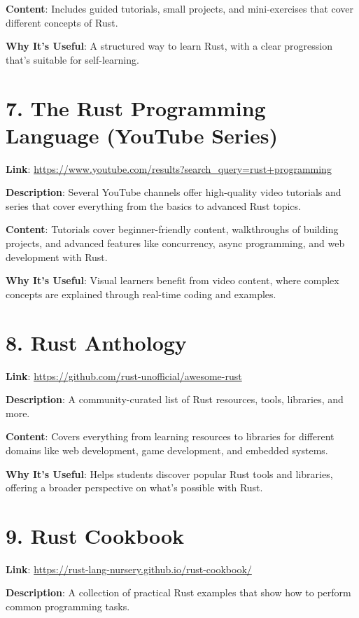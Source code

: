 \documentclass[12pt]{article}
\begin{document}
	\textbf{Content}: Includes guided tutorials, small projects, and mini-exercises that cover different concepts of Rust.
	
	\textbf{Why It’s Useful}: A structured way to learn Rust, with a clear progression that’s suitable for self-learning.
	
	\section*{7. The Rust Programming Language (YouTube Series)}
	\textbf{Link}: \url{https://www.youtube.com/results?search_query=rust+programming}
	
	\textbf{Description}: Several YouTube channels offer high-quality video tutorials and series that cover everything from the basics to advanced Rust topics.
	
	\textbf{Content}: Tutorials cover beginner-friendly content, walkthroughs of building projects, and advanced features like concurrency, async programming, and web development with Rust.
	
	\textbf{Why It’s Useful}: Visual learners benefit from video content, where complex concepts are explained through real-time coding and examples.
	
	\section*{8. Rust Anthology}
	\textbf{Link}: \href{https://github.com/rust-unofficial/awesome-rust}{https://github.com/rust-unofficial/awesome-rust}
	
	\textbf{Description}: A community-curated list of Rust resources, tools, libraries, and more.
	
	\textbf{Content}: Covers everything from learning resources to libraries for different domains like web development, game development, and embedded systems.
	
	\textbf{Why It’s Useful}: Helps students discover popular Rust tools and libraries, offering a broader perspective on what’s possible with Rust.
	
	\section*{9. Rust Cookbook}
	\textbf{Link}: \href{https://rust-lang-nursery.github.io/rust-cookbook/}{https://rust-lang-nursery.github.io/rust-cookbook/}
	
	\textbf{Description}: A collection of practical Rust examples that show how to perform common programming tasks.
	
\end{document}
